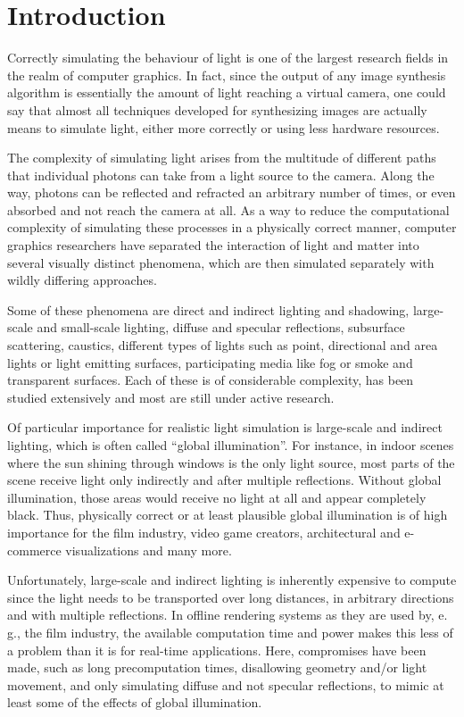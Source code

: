 
\chapter{Introduction}
\label{chap:introduction}

Correctly simulating the behaviour of light is one of the largest research fields in the realm of computer graphics. In fact, since the output of any image synthesis algorithm is essentially the amount of light reaching a virtual camera, one could say that almost all techniques developed for synthesizing images are actually means to simulate light, either more correctly or using less hardware resources.

The complexity of simulating light arises from the multitude of different paths that individual photons can take from a light source to the camera. Along the way, photons can be reflected and refracted an arbitrary number of times, or even absorbed and not reach the camera at all. As a way to reduce the computational complexity of simulating these processes in a physically correct manner, computer graphics researchers have separated the interaction of light and matter into several visually distinct phenomena, which are then simulated separately with wildly differing approaches.

Some of these phenomena are direct and indirect lighting and shadowing, large-scale and small-scale lighting, diffuse and specular reflections, subsurface scattering, caustics, different types of lights such as point, directional and area lights or light emitting surfaces, participating media like fog or smoke and transparent surfaces. Each of these is of considerable complexity, has been studied extensively and most are still under active research.

Of particular importance for realistic light simulation is large-scale and indirect lighting, which is often called ``global illumination''. For instance, in indoor scenes where the sun shining through windows is the only light source, most parts of the scene receive light only indirectly and after multiple reflections. Without global illumination, those areas would receive no light at all and appear completely black. Thus, physically correct or at least plausible global illumination is of high importance for the film industry, video game creators, architectural and e-commerce visualizations and many more.

Unfortunately, large-scale and indirect lighting is inherently expensive to compute since the light needs to be transported over long distances, in arbitrary directions and with multiple reflections. In offline rendering systems as they are used by, e.\,g., the film industry, the available computation time and power makes this less of a problem than it is for real-time applications. Here, compromises have been made, such as long precomputation times, disallowing geometry and/or light movement, and only simulating diffuse and not specular reflections, to mimic at least some of the effects of global illumination.

